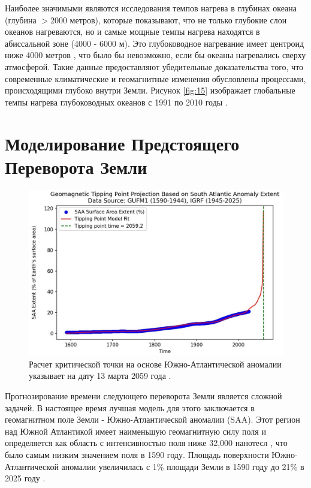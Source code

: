 \documentclass[10pt,twocolumn,letterpaper]{article}
\begin{document}
Наиболее значимыми являются исследования темпов нагрева в глубинах океана (глубина $>$2000 метров), которые показывают, что не только глубокие слои океанов нагреваются, но и самые мощные темпы нагрева находятся в абиссальной зоне (4000 - 6000 м). Это глубоководное нагревание имеет центроид ниже 4000 метров \cite{132,129}, что было бы невозможно, если бы океаны нагревались сверху атмосферой. Такие данные предоставляют убедительные доказательства того, что современные климатические и геомагнитные изменения обусловлены процессами, происходящими глубоко внутри Земли. Рисунок \ref{fig:15} изображает глобальные темпы нагрева глубоководных океанов с 1991 по 2010 годы \cite{132}.

\section{Моделирование Предстоящего Переворота Земли}

\begin{figure}[t]
\begin{center}
   \includegraphics[width=1\linewidth]{saa-crop.jpeg}
\end{center}
   \caption{Расчет критической точки на основе Южно-Атлантической аномалии указывает на дату 13 марта 2059 года \cite{125,126}.}
\label{fig:16}
\label{fig:onecol}
\end{figure}

Прогнозирование времени следующего переворота Земли является сложной задачей. В настоящее время лучшая модель для этого заключается в геомагнитном поле Земли - Южно-Атлантической аномалии (SAA). Этот регион над Южной Атлантикой имеет наименьшую геомагнитную силу поля и определяется как область с интенсивностью поля ниже 32,000 нанотесл \cite{135}, что было самым низким значением поля в 1590 году. Площадь поверхности Южно-Атлантической аномалии увеличилась с 1\% площади Земли в 1590 году до 21\% в 2025 году \cite{136}.
\end{document}

